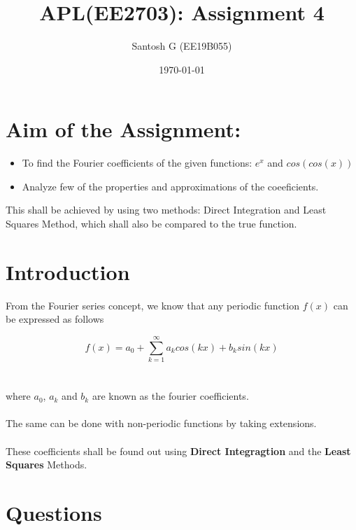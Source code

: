 \documentclass[11pt, a4paper]{article}
\title{APL(EE2703): Assignment 4} %
\author{Santosh G  (EE19B055)} %
\date{\today} %
\begin{document}
    \maketitle %

    \section{Aim of the Assignment:}
        \begin{itemize}
            \item To find the Fourier coefficients of the given functions: $e^x$ and $cos(cos(x))$
            \item Analyze few of the properties and approximations of the coeeficients.
        \end{itemize}
        This shall be achieved by using two methods: Direct Integration and Least Squares Method, which shall also be compared to the true function.
    \section{Introduction}
    From the Fourier series concept, we know that any periodic function $f(x)$ can be expressed as follows
        
        \begin{equation}
            f(x) = a_0 + \sum_{k=1}^{\infty}a_kcos(kx) + b_ksin(kx)
        \end{equation}
        \\
        \\where $a_0$, $a_k$ and $b_k$ are known as the fourier coefficients.\\
        \\The same can be done with non-periodic functions by taking extensions.\\
        \\These coefficients shall be found out using \textbf{Direct Integragtion} and the \textbf{Least Squares} Methods. 
         
         
	\section{Questions}
\end{document}
